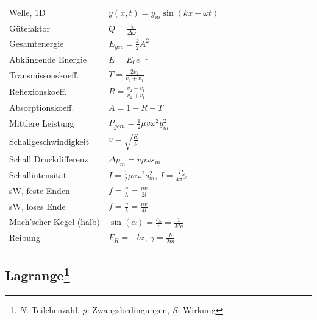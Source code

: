 \documentclass[12pt,a4paper]{article}
\renewcommand{\=}[1]{\stackrel{#1}{=}}
\theoremstyle{definition}
\theoremstyle{remark}
\begin{document}
\begin{center}
\begin{minipage}[t]{.5\linewidth}
\begin{tabular}{ll}
Welle, 1D & $y(x,t) = y_m \sin(kx - \omega t)$\\
Gütefaktor & $Q = \frac{\omega_0}{\Delta \omega}$\\
Gesamtenergie & $E_{ges} = \frac{k}{2}A^2$\\
Abklingende Energie & $E = E_0 e^{-\frac{t}{\tau}}$\\
Transmissonskoeff. & $T = \frac{2v_2}{v_2 + v_1}$\\
Reflexionskoeff. & $R = \frac{v_2 - v_1}{v_2 + v_1}$\\
Absorptionskoeff. & $A = 1 - R - T$\\
Mittlere Leistung & $P_{gem} = \frac{1}{2}\mu v \omega^2 y_m^2$\\
Schallgeschwindigkeit & $v = \sqrt{\frac{K}{\rho}}$\\
Schall Druckdifferenz & $\Delta p_m = v \rho \omega s_m$\\
Schallintensität & $I = \frac{1}{2} \rho v \omega^2 s_m^2$, $I = \frac{P_S}{4 \pi r^2}$\\
sW, feste Enden & $f = \frac{v}{\lambda} = \frac{nv}{2l}$\\
sW, loses Ende & $f = \frac{v}{\lambda} = \frac{nv}{4l}$\\
Mach'scher Kegel (halb) & $\sin(\alpha) = \frac{c_S}{v} = \frac{1}{Ma}$\\
Reibung & $F_R = -b \dot{z}$, $\gamma = \frac{b}{2m}$\\
\end{tabular}
\end{minipage}
\end{center}

\newpage

\subsection[Lagrange]{Lagrange\let\thefootnote\relax\footnote{$N$: Teilchenzahl, $p$: Zwangsbedingungen, $S$: Wirkung}}
\end{document}
